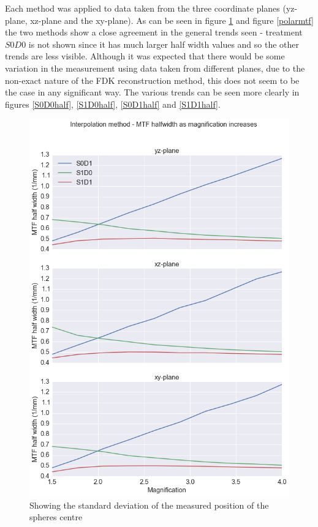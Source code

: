 \documentclass[
  twoside,
  11pt, a4paper,
  footinclude=true,
  headinclude=true,
  cleardoublepage=empty
]{scrbook}
\begin{document}
Each method was applied to data taken from the three coordinate planes (yz-plane, xz-plane and the xy-plane). As can be seen in figure \ref{interpmtf} and figure \ref{polarmtf} the two methods show a close agreement in the general trends seen - treatment $S0D0$ is not shown since it has much larger half width values and so the other trends are less visible. Although it was expected that there would be some variation in the measurement using data taken from different planes, due to the non-exact nature of the FDK reconstruction method, this does not seem to be the case in any significant way. The various trends can be seen more clearly in figures \ref{S0D0half}, \ref{S1D0half}, \ref{S0D1half} and \ref{S1D1half}.

\begin{figure}[h!]
  \centering
    \includegraphics[width=\textwidth]{figures/interpmtf.png}
    \caption{Showing the standard deviation of the measured position of the spheres centre}
        \label{interpmtf}
\end{figure}
\end{document}
